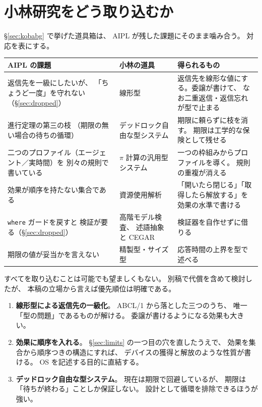 \documentclass[11pt,a4paper]{ltjsarticle}
\theoremstyle{definition}
\theoremstyle{remark}
\begin{document}
\section{小林研究をどう取り込むか}
\label{sec:kobayashi}

\S\ref{sec:kobabg} で挙げた道具箱は、
AIPL が残した課題にそのまま噛み合う。
対応を表にする。

\begin{center}
\begin{tabular}{p{}p{}p{}}
\toprule
AIPL の課題 & 小林の道具 & 得られるもの \\
\midrule
返信先を一級にしたいが、
「ちょうど一度」を守れない
（\S\ref{sec:dropped}） &
線形型\cite{kptl96} &
返信先を線形な値にする。委譲が書けて、
なお二重返信・返信忘れが型で止まる \\
\addlinespace
進行定理の第三の枝
（期限の無い場合の待ちの循環） &
デッドロック自由な型システム
\cite{kobadf97,kobadf00,kobadf06} &
期限に頼らずに枝を消す。
期限は工学的な保険として残せる \\
\addlinespace
二つのプロファイル（エージェント／実時間）を
別々の規則で書いている &
$\pi$ 計算の汎用型システム\cite{kobagen01} &
一つの枠組みからプロファイルを導く。
規則の重複が消える \\
\addlinespace
効果が順序を持たない集合である &
資源使用解析\cite{kobares} &
「開いたら閉じる」「取得したら解放する」を
効果の水準で書ける \\
\addlinespace
\texttt{where} ガードを戻すと
検証が要る（\S\ref{sec:dropped}） &
高階モデル検査\cite{koba09,ko09}、
述語抽象と CEGAR &
検証器を自作せずに借りる \\
\addlinespace
期限の値が妥当かを言えない &
精製型・サイズ型\cite{kobasize} &
応答時間の上界を型で述べる \\
\bottomrule
\end{tabular}
\end{center}

すべてを取り込むことは可能でも望ましくもない。
別稿\cite{selfkoba}で代償を含めて検討したが、
本稿の立場から言えば優先順位は明確である。

\begin{enumerate}
\item \textbf{線形型による返信先の一級化}。
      ABCL/1 から落とした三つのうち、
      唯一「型の問題」であるものが解ける。
      委譲が書けるようになる効果も大きい。
\item \textbf{効果に順序を入れる}。
      \S\ref{sec:limits} の一つ目の穴を直したうえで、
      効果を集合から順序つきの構造にすれば、
      デバイスの獲得と解放のような性質が書ける。
      OS を記述する目的\cite{selfxinu}に直結する。
\item \textbf{デッドロック自由な型システム}。
      現在は期限で回避しているが、
      期限は「待ちが終わる」ことしか保証しない。
      設計として循環を排除できるほうが強い。
\end{enumerate}
\end{document}
